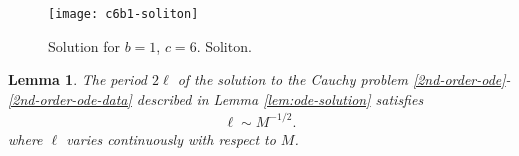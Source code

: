 \documentclass[12pt,reqno]{amsart}
\numberwithin{equation}{section}  %
\newtheorem{lemma}[theorem]{Lemma}
\begin{document}
\newpage

\begin{figure}[h!]
  \caption{Solution for $b=1$, $c=6$. Soliton.}
  \texttt{[image: c6b1-soliton]}
\end{figure}

%
%
%
%
%
%
%
%
%
\begin{lemma}
  The period $2 \ell$ of the solution to the Cauchy problem
  \eqref{2nd-order-ode}-\eqref{2nd-order-ode-data} described in Lemma
  \ref{lem:ode-solution} satisfies
  \begin{equation}
  \begin{split}
    \ell \sim M^{-1/2}.
  \end{split}
  \label{period-est}
  \end{equation}
  where $\ell$ varies continuously with respect to $M$.
\label{lem:period-est}
\end{lemma}
%
%
%
%
\end{document}
